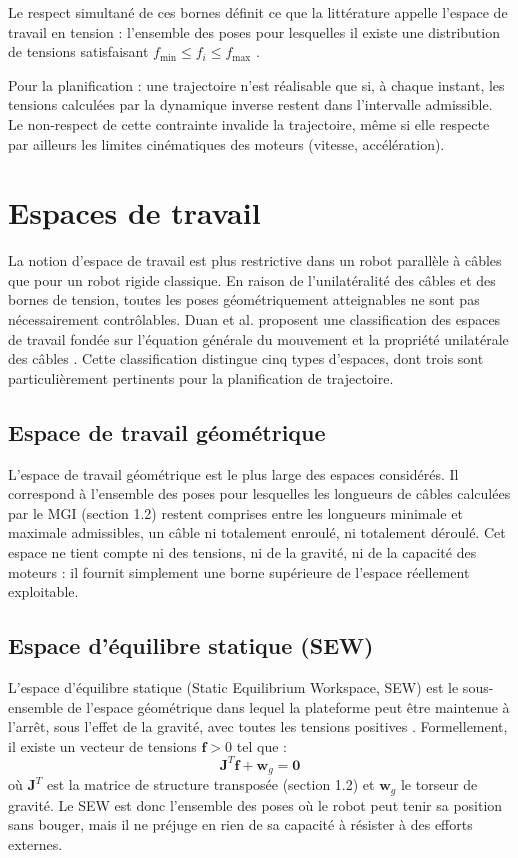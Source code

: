 Le respect simultané de ces bornes définit ce que la littérature appelle l'espace de travail en tension : l'ensemble des poses pour lesquelles il existe une distribution de tensions satisfaisant $f_{\min} \leq f_i \leq f_{\max}$ \cite{tho2022}.

Pour la planification : une trajectoire n'est réalisable que si, à chaque instant, les tensions calculées par la dynamique inverse restent dans l'intervalle admissible. Le non-respect de cette contrainte invalide la trajectoire, même si elle respecte par ailleurs les limites cinématiques des moteurs (vitesse, accélération).

\section{Espaces de travail}

La notion d'espace de travail est plus restrictive dans un robot parallèle à câbles que pour un robot rigide classique. En raison de l'unilatéralité des câbles et des bornes de tension, toutes les poses géométriquement atteignables ne sont pas nécessairement contrôlables. Duan et al. proposent une classification des espaces de travail fondée sur l'équation générale du mouvement et la propriété unilatérale des câbles \cite{duan2014}. Cette classification distingue cinq types d'espaces, dont trois sont particulièrement pertinents pour la planification de trajectoire.

\subsection{Espace de travail géométrique}

L'espace de travail géométrique est le plus large des espaces considérés. Il correspond à l'ensemble des poses pour lesquelles les longueurs de câbles calculées par le MGI (section 1.2) restent comprises entre les longueurs minimale et maximale admissibles, un câble ni totalement enroulé, ni totalement déroulé. Cet espace ne tient compte ni des tensions, ni de la gravité, ni de la capacité des moteurs : il fournit simplement une borne supérieure de l'espace réellement exploitable.

\subsection{Espace d'équilibre statique (SEW)}

L'espace d'équilibre statique (Static Equilibrium Workspace, SEW) est le sous-ensemble de l'espace géométrique dans lequel la plateforme peut être maintenue à l'arrêt, sous l'effet de la gravité, avec toutes les tensions positives \cite{duan2014}. Formellement, il existe un vecteur de tensions $\mathbf{f} > 0$ tel que :
\begin{equation}
\mathbf{J}^T \mathbf{f} + \mathbf{w}_g = \mathbf{0}
\label{eq:sew}
\end{equation}
où $\mathbf{J}^T$ est la matrice de structure transposée (section 1.2) et $\mathbf{w}_g$ le torseur de gravité. Le SEW est donc l'ensemble des poses où le robot peut tenir sa position sans bouger, mais il ne préjuge en rien de sa capacité à résister à des efforts externes.

